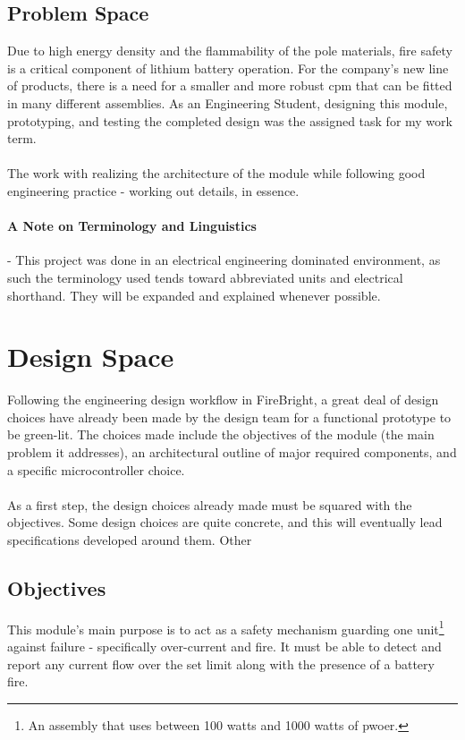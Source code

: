 \documentclass[12pt]{article}
\begin{document}
	\subsection{Problem Space}
	Due to high energy density and the flammability of the pole materials, fire safety is a critical component of lithium battery operation. For the company's new line of products, there is a need for a smaller and more robust \acrfull{cpm} that can be fitted in many different assemblies. As an Engineering Student, designing this module, prototyping, and testing the completed design was the assigned task for my work term.
	
    \paragraph{}
	The work with realizing the architecture of the module while following good engineering practice - working out details, in essence.

  \paragraph{A Note on Terminology and Linguistics} - This project was done in an electrical engineering dominated environment, as such the terminology used tends toward abbreviated units and electrical shorthand. They will be expanded and explained whenever possible.
  
  \section{Design Space}
  Following the engineering design workflow in FireBright, a great deal of design choices have already been made by the design team for a functional prototype to be green-lit. The choices made include the objectives of the module (the main problem it addresses), an architectural outline of major required components, and a specific microcontroller choice.

  \paragraph{}
  As a first step, the design choices already made must be squared with the objectives. Some design choices are quite concrete, and this will eventually lead specifications developed around them. Other

  \subsection{Objectives}
  This module's main purpose is to act as a safety mechanism guarding one unit\footnote{An assembly that uses between 100 watts and 1000 watts of pwoer.} against failure - specifically over-current and fire. It must be able to detect and report any current flow over the set limit along with the presence of a battery fire.
\end{document}
